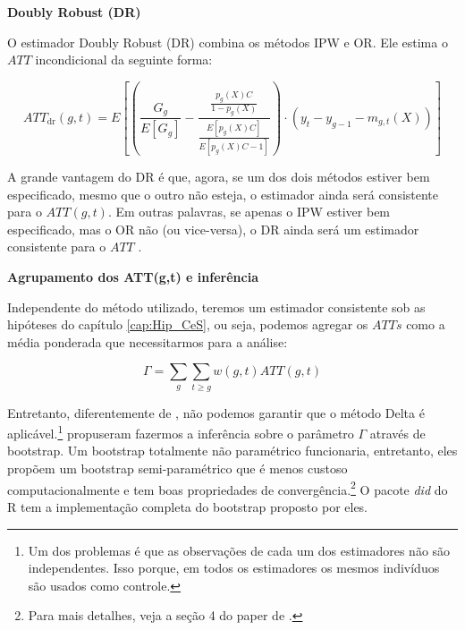 \documentclass[portugues]{article}
\begin{document}
\vspace{3mm}

\textbf{Doubly Robust (DR)}

\vspace{2mm}

O estimador Doubly Robust (DR) combina os métodos IPW e OR. Ele estima o \(ATT\) incondicional da seguinte forma:

\begin{equation}\label{eq:doble_robust}
    ATT_{\text{dr}}(g,t) = E\left[\left(\frac{G_g}{E[G_g]} - \frac{\frac{p_g(X)C}{1-p_g(X)}}{\frac{E[p_g(X)C]}{E[p_g(X)C-1]}}\right) \cdot \left(y_{t} - y_{g-1} - m_{g,t}(X)\right)\right]
\end{equation}

A grande vantagem do DR é que, agora, se um dos dois métodos estiver bem especificado, mesmo que o outro não esteja, o estimador ainda será consistente para o \(ATT(g,t)\). Em outras palavras, se apenas o IPW estiver bem especificado, mas o OR não (ou vice-versa), o DR ainda será um estimador consistente para o \(ATT\) \citep{callaway2021difference}.

\vspace{3mm}

\textbf{Agrupamento dos ATT(g,t) e inferência}

\vspace{2mm}

Independente do método utilizado, teremos um estimador consistente sob as hipóteses do capítulo \ref{cap:Hip_CeS}, ou seja, podemos agregar os \(ATTs\) como a média ponderada que necessitarmos para a análise:

\[
\Gamma = \sum_g \sum_{t \geq g} w(g,t) ATT(g,t)
\]

Entretanto, diferentemente de \cite{sun2021estimating}, não podemos garantir que o método Delta é aplicável.\footnote{Um dos problemas é que as observações de cada um dos estimadores não são independentes. Isso porque, em todos os estimadores os mesmos indivíduos são usados como controle.} \cite{callaway2021difference} propuseram fazermos a inferência sobre o parâmetro \(\Gamma\) através de bootstrap. Um bootstrap totalmente não paramétrico funcionaria, entretanto, eles propõem um bootstrap semi-paramétrico que é menos custoso computacionalmente e tem boas propriedades de convergência.\footnote{Para mais detalhes, veja a seção 4 do paper de \cite{callaway2021difference}.} O pacote \textit{did} do R tem a implementação completa do bootstrap proposto por eles. 
\end{document}
